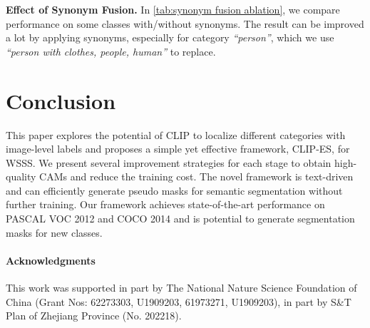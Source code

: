 \documentclass[10pt,twocolumn,letterpaper]{article}
\begin{document}
\textbf{Effect of Synonym Fusion.} In \cref{tab:synonym fusion ablation}, we compare performance on some classes with/without synonyms. The result can be improved a lot by applying synonyms, especially for category \textit{``person''}, which we use \textit{``person with clothes, people, human''} to replace.

\begin{table}
  \centering
  \caption{Ablation study of synonym fusion on PASCAL VOC 2012 train set. The results above are based on the initial CAMs and not refined by CAA.}
  \vspace{-4mm}
  \label{tab:synonym fusion ablation}
\end{table}





\section{Conclusion}
This paper explores the potential of CLIP to localize different categories with image-level labels 
and proposes a simple yet effective framework, CLIP-ES, for WSSS. We present several improvement strategies for each stage to obtain high-quality CAMs and reduce the training cost. The novel framework is text-driven and can efficiently generate pseudo masks for semantic segmentation without further training. Our framework achieves state-of-the-art performance on PASCAL VOC 2012 and COCO 2014
and is potential to generate segmentation masks for new classes.


\paragraph{Acknowledgments} This work was supported in part by The National Nature Science Foundation of China (Grant Nos: 62273303, U1909203, 61973271, U1909203), in part by S\&T Plan of Zhejiang Province (No. 202218).

{\small


}


\newpage
\end{document}
